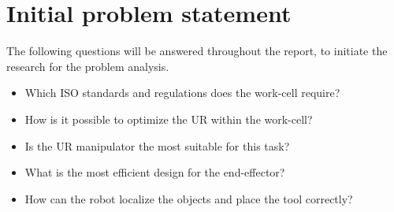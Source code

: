 \chapter{Initial problem statement}\label{ch:Initial problem statment}


The following questions will be answered throughout the report, to initiate the research for the problem analysis.

\begin{itemize}
    \item Which ISO standards and regulations does the work-cell require?
    \item How is it possible to optimize the UR within the work-cell?
    \item Is the UR manipulator the most suitable for this task?
    \item What is the most efficient design for the end-effector?
    \item How can the robot localize the objects and place the tool correctly?
\end{itemize}